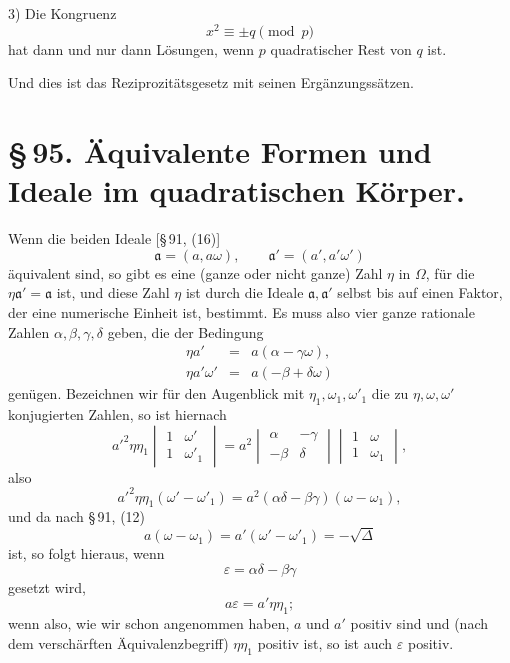 \documentclass[11pt]{article}
\begin{document}
3) Die Kongruenz
\[
 x^2\equiv\pm q\pmod p
\]
hat dann und nur dann Lösungen, wenn $p$ quadratischer Rest von $q$ ist.

Und dies ist das Reziprozitätsgesetz mit seinen Ergänzungssätzen.



\section*{\S\,95. Äquivalente Formen und Ideale im quadratischen Körper.}

Wenn die beiden Ideale [\S\,91, (16)]
\begin{equation}
 \mathfrak a=(a,a\omega),\qquad \mathfrak a'=(a',a'\omega')
\tag{1}
\end{equation}
äquivalent sind, so gibt es eine (ganze oder nicht ganze) Zahl $\eta$ in $\Omega$, für die $\eta\mathfrak a'=\mathfrak a$ ist, und diese Zahl $\eta$ ist durch die Ideale $\mathfrak a,\mathfrak a'$ selbst bis auf einen Faktor, der eine numerische Einheit ist, bestimmt. Es muss also vier ganze rationale Zahlen $\alpha,\beta,\gamma,\delta$ geben, die der Bedingung
\begin{equation}
\begin{array}{rcl}
 \eta a'&=&a(\alpha-\gamma\omega),\\
 \eta a'\omega'&=&a(-\beta+\delta\omega)
\end{array}
\tag{2}
\end{equation}
genügen. Bezeichnen wir für den Augenblick mit $\eta_1,\omega_1,\omega'_1$ die zu $\eta,\omega,\omega'$ konjugierten Zahlen, so ist hiernach
\[
 a'^2\eta\eta_1
 \begin{vmatrix}1&\omega'\\[0.15em]1&\omega'_1\end{vmatrix}
 =a^2
 \begin{vmatrix}\alpha&-\gamma\\[0.15em]-\beta&\delta\end{vmatrix}
 \begin{vmatrix}1&\omega\\[0.15em]1&\omega_1\end{vmatrix},
\]
also
\[
 a'^2\eta\eta_1(\omega'-\omega'_1)=a^2(\alpha\delta-\beta\gamma)(\omega-\omega_1),
\]
und da nach \S\,91, (12)
\[
 a(\omega-\omega_1)=a'(\omega'-\omega'_1)=-\sqrt{\Delta}
\]
ist, so folgt hieraus, wenn
\[
 \varepsilon=\alpha\delta-\beta\gamma
\]
gesetzt wird,
\begin{equation}
 a\varepsilon=a'\eta\eta_1;
\tag{3}
\end{equation}
wenn also, wie wir schon angenommen haben, $a$ und $a'$ positiv sind und (nach dem verschärften Äquivalenzbegriff) $\eta\eta_1$ positiv ist, so ist auch $\varepsilon$ positiv.
\end{document}

